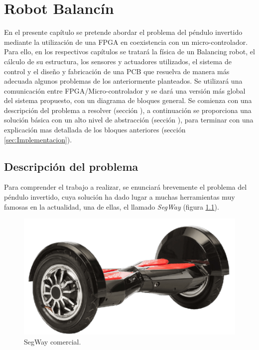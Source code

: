 \chapter{Robot Balancín}\label{sec: BalancingRobot}
En el presente capítulo se pretende abordar el problema del péndulo invertido mediante la utilización de una FPGA en coexistencia con un micro-controlador. Para ello, en los respectivos capítulos se tratará la física de un Balancing robot, el cálculo de su estructura, los sensores y actuadores utilizados, el sistema de control y el diseño y fabricación de una PCB que resuelva de manera más adecuada algunos problemas de los anteriormente planteados. Se utilizará una comunicación entre FPGA/Micro-controlador y se dará una versión más global del sistema propuesto, con un diagrama de bloques general. \newline
Se comienza con una descripción del problema a resolver (sección \label{sec:Descripcion_balancin}
), a continuación se proporciona una solución básica con un alto nivel de abstracción (sección \label{sec:Diseno}), para terminar con una explicación mas detallada de los bloques anteriores (sección \ref{sec:Implementacion}).
\section{Descripción del problema} \label{sec:Descripcion_balancin}

Para comprender el trabajo a realizar, se enunciará brevemente el problema del péndulo invertido, cuya solución ha dado lugar a muchas herramientas muy famosas en la actualidad, una de ellas, el llamado \textit{SegWay} (figura \ref{fig:segway}).

\begin{figure}[H]
	\center
	\includegraphics[trim = 0mm 0mm 0mm 0mm, clip,scale=0.4]{imagenes/Balancing_robot/segway}
	\caption{SegWay comercial.}
	\label{fig:segway}
\end{figure}


